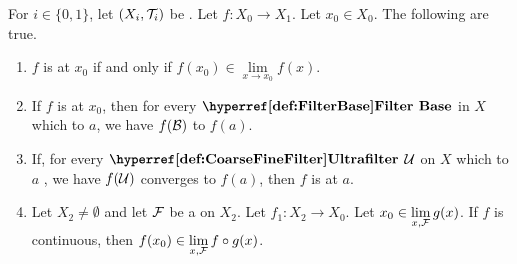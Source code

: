 \begin{prop}
\label{prop:FunctionLimitIffContinuous}
For $i \in \{0,1\}$, let $(X_i, \mathcal{T}_i)$ be \TopologicalSpaces. 
Let $f:X_0 \to X_1$. 
Let $x_0 \in X_0$. 
The following are true. 
\begin{enumerate}[label=(\roman*), ref={\ref{prop:FunctionLimitIffContinuous}~\roman*}]
    \item 
    \label{prop:Continuity:ContinuousIffLimit}
    $f$ is \ContinuousFunction at $x_0$ 
    if and only if  
    $f(x_0) \in \lim\limits_{x \to x_0} f(x)$. 
    \item 
    \label{prop:Continuity:FilterBaseConvergence}
    If $f$ is \ContinuousFunction at $x_0$, then 
    for every $\FilterBase$ \scB in $X$ which \FilterConverges 
    to $a$, we have $f(\mathcal{B})$ \FilterConverges to $f(a)$.
    \item  
    \label{prop:Continuity:UltrafilterConvergence}
    If, for every $\UltraFilter$ $\mathcal{U}$ on $X$ which \FilterConverges to $a$
    , we have $f(\mathcal{U})$ converges to $f(a)$, then $f$ is \ContinuousFunction at $a$. 
    \item 
    \label{prop:Continuity:LimitComposition}
    Let $X_2 \neq \emptyset$ and let $\mathcal{F}$ be a \Filter on $X_2$. Let 
    $f_1:X_2 \to X_0$. 
    Let $x_0 \in \lim\limits_{x, \mathcal{F}}g(x)$. 
    If $f$ is continuous, then $f(x_0) \in \lim\limits_{x, \mathcal{F}} f \circ g(x)$. 
\end{enumerate}
\end{prop}
